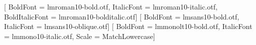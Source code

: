 %
%

\usepackage{fontspec}
\usepackage{amssymb}
\usepackage{amsmath}

\usepackage{etoolbox}
\setlength{\tabcolsep}{4pt}

%
%
%
\setmainfont{lmroman10-regular.otf}[
  BoldFont       = lmroman10-bold.otf,
  ItalicFont     = lmroman10-italic.otf,
  BoldItalicFont = lmroman10-bolditalic.otf]
\setsansfont{lmsans10-regular.otf}[
  BoldFont   = lmsans10-bold.otf,
  ItalicFont = lmsans10-oblique.otf]
\setmonofont{lmmono10-regular.otf}[
  BoldFont   = lmmonolt10-bold.otf,
  ItalicFont = lmmono10-italic.otf,
  Scale      = MatchLowercase]

